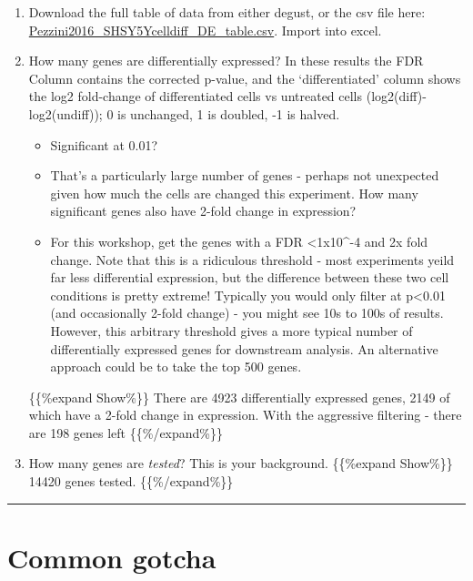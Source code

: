 \documentclass[
]{book}
\begin{document}
\begin{enumerate}
\def\labelenumi{\arabic{enumi}.}
\item
  Download the full table of data from either degust, or the csv file here:
  \href{https://monashbioinformaticsplatform.github.io/enrichment_analysis_workshop/data/Pezzini2016_SHSY5Ycelldiff_DE_table.csv}{Pezzini2016\_SHSY5Ycelldiff\_DE\_table.csv}. Import into excel.
\item
  How many genes are differentially expressed? In these results the FDR Column contains the corrected p-value, and the `differentiated' column shows the log2 fold-change of differentiated cells vs untreated cells (log2(diff)-log2(undiff)); 0 is unchanged, 1 is doubled, -1 is halved.

  \begin{itemize}
  \item
    Significant at 0.01?
  \item
    That's a particularly large number of genes - perhaps not unexpected given how much the cells are changed this experiment. How many significant genes also have 2-fold change in expression?
  \item
    For this workshop, get the genes with a FDR \textless1x10\^{}-4 and 2x fold change. Note that this is a ridiculous threshold - most experiments yeild far less differential expression, but the difference between these two cell conditions is pretty extreme! Typically you would only filter at p\textless0.01 (and occasionally 2-fold change) - you might see 10s to 100s of results. However, this arbitrary threshold gives a more typical number of differentially expressed genes for downstream analysis. An alternative approach could be to take the top 500 genes.
  \end{itemize}

  \{\{\%expand Show\%\}\} There are 4923 differentially expressed genes, 2149 of which have a 2-fold change in expression. With the aggressive filtering - there are 198 genes left \{\{\%/expand\%\}\}
\item
  How many genes are \emph{tested}? This is your background.
  \{\{\%expand Show\%\}\} 14420 genes tested. \{\{\%/expand\%\}\}
\end{enumerate}

\begin{center}\rule{0.5\linewidth}{0.5pt}\end{center}

\section{Common gotcha}\label{common-gotcha}
\end{document}
